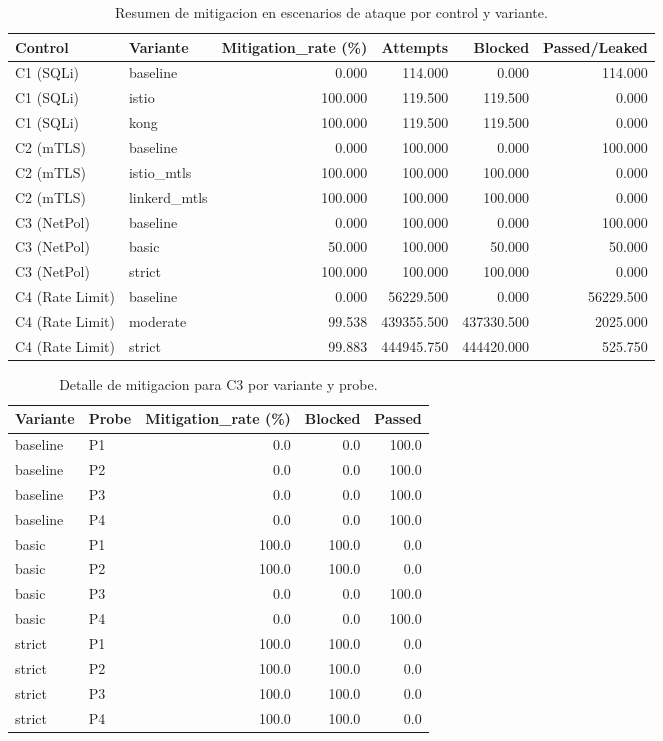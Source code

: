 \begin{table}[htbp]
\centering
\small
\caption{Resumen de mitigacion en escenarios de ataque por control y variante.}
\label{tab:attack-mitigation-summary}
\begin{tabular}{llrrrr}
\toprule
Control & Variante & Mitigation\_rate (\%) & Attempts & Blocked & Passed/Leaked \\
\midrule
C1 (SQLi) & baseline      & 0.000  & 114.000   & 0.000    & 114.000 \\
C1 (SQLi) & istio         & 100.000 & 119.500  & 119.500  & 0.000 \\
C1 (SQLi) & kong          & 100.000 & 119.500  & 119.500  & 0.000 \\
C2 (mTLS) & baseline      & 0.000  & 100.000   & 0.000    & 100.000 \\
C2 (mTLS) & istio\_mtls   & 100.000 & 100.000  & 100.000  & 0.000 \\
C2 (mTLS) & linkerd\_mtls & 100.000 & 100.000  & 100.000  & 0.000 \\
C3 (NetPol) & baseline    & 0.000  & 100.000   & 0.000    & 100.000 \\
C3 (NetPol) & basic       & 50.000 & 100.000   & 50.000   & 50.000 \\
C3 (NetPol) & strict      & 100.000 & 100.000  & 100.000  & 0.000 \\
C4 (Rate Limit) & baseline & 0.000 & 56229.500 & 0.000    & 56229.500 \\
C4 (Rate Limit) & moderate & 99.538 & 439355.500 & 437330.500 & 2025.000 \\
C4 (Rate Limit) & strict   & 99.883 & 444945.750 & 444420.000 & 525.750 \\
\bottomrule
\end{tabular}
\end{table}

\begin{table}[htbp]
\centering
\small
\caption{Detalle de mitigacion para C3 por variante y probe.}
\label{tab:c3-by-probe}
\begin{tabular}{llrrr}
\toprule
Variante & Probe & Mitigation\_rate (\%) & Blocked & Passed \\
\midrule
baseline & P1 & 0.0   & 0.0   & 100.0 \\
baseline & P2 & 0.0   & 0.0   & 100.0 \\
baseline & P3 & 0.0   & 0.0   & 100.0 \\
baseline & P4 & 0.0   & 0.0   & 100.0 \\
basic    & P1 & 100.0 & 100.0 & 0.0 \\
basic    & P2 & 100.0 & 100.0 & 0.0 \\
basic    & P3 & 0.0   & 0.0   & 100.0 \\
basic    & P4 & 0.0   & 0.0   & 100.0 \\
strict   & P1 & 100.0 & 100.0 & 0.0 \\
strict   & P2 & 100.0 & 100.0 & 0.0 \\
strict   & P3 & 100.0 & 100.0 & 0.0 \\
strict   & P4 & 100.0 & 100.0 & 0.0 \\
\bottomrule
\end{tabular}
\end{table}

